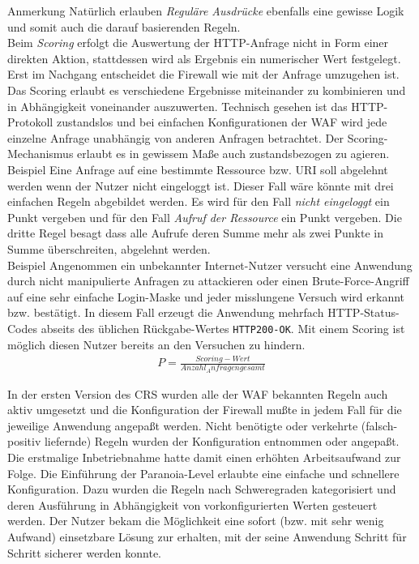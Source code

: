 \textcolor{bhtGray}{ Anmerkung} Natürlich erlauben \emph{Reguläre Ausdrücke} ebenfalls eine gewisse Logik und somit auch die darauf basierenden Regeln.\\

Beim \emph{Scoring} erfolgt die Auswertung der HTTP-Anfrage nicht in Form einer direkten Aktion, stattdessen wird als Ergebnis ein numerischer Wert festgelegt. Erst im Nachgang entscheidet die Firewall wie mit der Anfrage umzugehen ist. Das Scoring erlaubt es verschiedene Ergebnisse miteinander zu kombinieren und in Abhängigkeit voneinander auszuwerten. Technisch gesehen ist das HTTP-Protokoll zustandslos und bei einfachen Konfigurationen der WAF  wird jede einzelne Anfrage unabhängig von anderen Anfragen betrachtet. Der Scoring-Mechanismus erlaubt es in gewissem Maße auch zustandsbezogen zu agieren. \\


\textcolor{bhtGray}{ Beispiel} Eine Anfrage auf eine bestimmte Ressource bzw. URI soll abgelehnt werden wenn der Nutzer nicht eingeloggt ist. Dieser Fall wäre könnte mit drei einfachen Regeln abgebildet werden. Es wird für den Fall \emph{nicht eingeloggt} ein Punkt vergeben und für den Fall \emph{Aufruf der Ressource} ein Punkt vergeben. Die dritte Regel besagt dass alle Aufrufe deren Summe mehr als zwei Punkte in Summe überschreiten, abgelehnt werden.\\

\textcolor{bhtGray}{ Beispiel} Angenommen ein unbekannter Internet-Nutzer versucht eine Anwendung durch nicht manipulierte Anfragen zu attackieren oder einen Brute-Force-Angriff auf eine sehr einfache Login-Maske und jeder misslungene Versuch wird erkannt bzw. bestätigt. In diesem Fall erzeugt die Anwendung mehrfach HTTP-Status-Codes abseits des üblichen Rückgabe-Wertes \verb=HTTP200-OK=. Mit einem Scoring ist möglich diesen Nutzer bereits an den Versuchen zu hindern.
\begin{align}
  P = \frac{Scoring-Wert}{Anzahl_Anfragen gesamt}
\end{align}

In der ersten Version des CRS wurden alle der WAF bekannten Regeln auch aktiv umgesetzt und die Konfiguration der Firewall mußte in jedem Fall für die jeweilige Anwendung angepaßt werden. Nicht benötigte oder verkehrte (falsch-positiv liefernde) Regeln wurden der Konfiguration entnommen oder angepaßt. Die erstmalige Inbetriebnahme hatte damit einen erhöhten Arbeitsaufwand zur Folge. Die Einführung der Paranoia-Level erlaubte eine einfache und schnellere Konfiguration. Dazu wurden die Regeln nach Schweregraden kategorisiert und deren Ausführung in Abhängigkeit von vorkonfigurierten Werten gesteuert werden. Der Nutzer bekam die Möglichkeit eine sofort (bzw. mit sehr wenig Aufwand) einsetzbare Lösung zur erhalten, mit der seine Anwendung Schritt für Schritt sicherer werden konnte.

